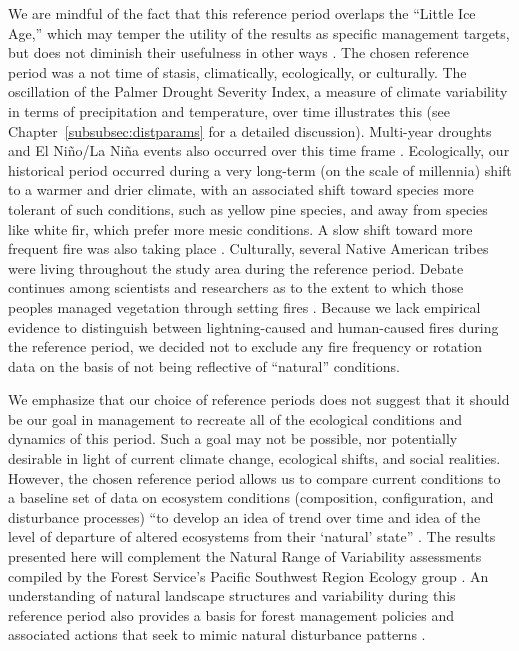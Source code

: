 We are mindful of the fact that this reference period overlaps the ``Little Ice Age,'' which may temper the utility of the results as specific management targets, but does not diminish their usefulness in other ways \citep{Minnich2007,Safford2013}. The chosen reference period was a not time of stasis, climatically, ecologically, or culturally. The oscillation of the Palmer Drought Severity Index, a measure of climate variability in terms of precipitation and temperature, over time illustrates this (see Chapter~\ref{subsubsec:distparams} for a detailed discussion). Multi-year droughts and El Ni\~no/La Ni\~na events also occurred over this time frame \citep{Minnich2007}. Ecologically, our historical period occurred during a very long-term (on the scale of millennia) shift to a warmer and drier climate, with an associated shift toward species more tolerant of such conditions, such as yellow pine species, and away from species like white fir, which prefer more mesic conditions. A slow shift toward more frequent fire was also taking place \citep{Safford2013}. Culturally, several Native American tribes were living throughout the study area during the reference period. Debate continues among scientists and researchers as to the extent to which those peoples managed vegetation through setting fires \citep{Anderson1996}. Because we lack empirical evidence to distinguish between lightning-caused and human-caused fires during the reference period, we decided not to exclude any fire frequency or rotation data on the basis of not being reflective of ``natural'' conditions. 

We emphasize that our choice of reference periods does not suggest that it should be our goal in management to recreate all of the ecological conditions and dynamics of this period. Such a goal may not be possible, nor potentially desirable in light of current climate change, ecological shifts, and social realities. However, the chosen reference period allows us to compare current conditions to a baseline set of data on ecosystem conditions (composition, configuration, and disturbance processes) ``to develop an idea of trend over time and idea of the level of departure of altered ecosystems from their `natural' state'' \citep{Safford2013}. The results presented here will complement the Natural Range of Variability assessments compiled by the Forest Service's Pacific Southwest Region Ecology group \citep[e.g.,][]{Safford2013,Merriam2013,Meyer2013a,Meyer2013,Estes2013,Estes2013a,Gross2013}. An understanding of natural landscape structures and variability during this reference period also provides a basis for forest management policies and associated actions that seek to mimic natural disturbance patterns \citep{Romme2000,Buse2002}. 






